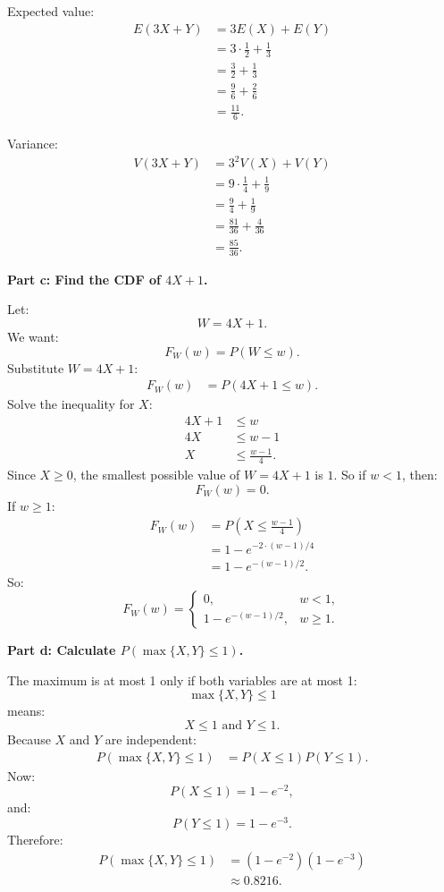 \documentclass[11pt,a4paper]{article}
\begin{document}
Expected value:
\begin{align*}
E(3X+Y)
&=3E(X)+E(Y)\\
&=3\cdot \frac{1}{2}+\frac{1}{3}\\
&=\frac{3}{2}+\frac{1}{3}\\
&=\frac{9}{6}+\frac{2}{6}\\
&=\frac{11}{6}.
\end{align*}

Variance:
\begin{align*}
V(3X+Y)
&=3^2V(X)+V(Y)\\
&=9\cdot \frac{1}{4}+\frac{1}{9}\\
&=\frac{9}{4}+\frac{1}{9}\\
&=\frac{81}{36}+\frac{4}{36}\\
&=\frac{85}{36}.
\end{align*}

\textbf{Part c: Find the CDF of \(4X+1\).}

Let:
\[
W=4X+1.
\]
We want:
\[
F_W(w)=P(W\le w).
\]
Substitute \(W=4X+1\):
\begin{align*}
F_W(w)
&=P(4X+1\le w).
\end{align*}
Solve the inequality for \(X\):
\begin{align*}
4X+1&\le w\\
4X&\le w-1\\
X&\le \frac{w-1}{4}.
\end{align*}
Since \(X\ge 0\), the smallest possible value of \(W=4X+1\) is \(1\). So if \(w<1\), then:
\[
F_W(w)=0.
\]
If \(w\ge 1\):
\begin{align*}
F_W(w)
&=P\left(X\le \frac{w-1}{4}\right)\\
&=1-e^{-2\cdot (w-1)/4}\\
&=1-e^{-(w-1)/2}.
\end{align*}
So:
\[
F_W(w)=
\begin{cases}
0, & w<1,\\
1-e^{-(w-1)/2}, & w\ge 1.
\end{cases}
\]

\textbf{Part d: Calculate \(P(\max\{X,Y\}\le 1)\).}

The maximum is at most 1 only if both variables are at most 1:
\[
\max\{X,Y\}\le 1
\]
means:
\[
X\le 1 \text{ and } Y\le 1.
\]
Because \(X\) and \(Y\) are independent:
\begin{align*}
P(\max\{X,Y\}\le 1)
&=P(X\le 1)P(Y\le 1).
\end{align*}
Now:
\[
P(X\le 1)=1-e^{-2},
\]
and:
\[
P(Y\le 1)=1-e^{-3}.
\]
Therefore:
\begin{align*}
P(\max\{X,Y\}\le 1)
&=(1-e^{-2})(1-e^{-3})\\
&\approx 0.8216.
\end{align*}
\end{document}
